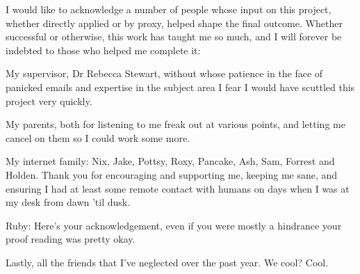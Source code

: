 \noindent
I would like to acknowledge a number of people whose input on this project, whether directly applied or by proxy, helped shape the final outcome. Whether successful or otherwise, this work has taught me so much, and I will forever be indebted to those who helped me complete it:

\bigskip
\noindent
My supervisor, Dr Rebecca Stewart, without whose patience in the face of panicked emails and expertise in the subject area I fear I would have scuttled this project very quickly. 

\bigskip
\noindent
My parents, both for listening to me freak out at various points, and letting me cancel on them so I could work some more.

\bigskip
\noindent
My internet family: Nix, Jake, Pottsy, Roxy, Pancake, Ash, Sam, Forrest and Holden. Thank you for encouraging and supporting me, keeping me sane, and ensuring I had at least some remote contact with humans on days when I was at my desk from dawn 'til dusk.

\bigskip
\noindent
Ruby: Here's your acknowledgement, even if you were mostly a hindrance your proof reading was pretty okay.

\bigskip 
\noindent
Lastly, all the friends that I've neglected over the past year. We cool? Cool.

